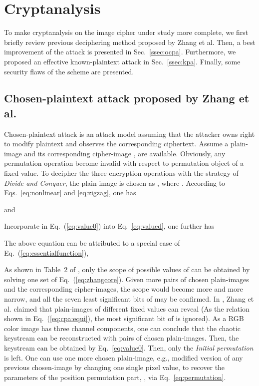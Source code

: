 \documentclass{ws-ijbc}
\begin{document}
\section{Cryptanalysis}
\label{sec:ca}

To make cryptanalysis on the image cipher under study more complete, we first briefly
review previous deciphering method proposed by Zhang et al. Then, a best improvement of the attack
is presented in Sec.~\ref{ssec:ocpa}. Furthermore, we proposed an effective known-plaintext attack in Sec.~\ref{ssec:kpa}.
Finally, some security flaws of the scheme are presented.

\subsection{Chosen-plaintext attack proposed by Zhang et al.}
\label{subsec:cpa:zhang}

Chosen-plaintext attack is an attack model assuming that the attacker owns right to modify
plaintext and observes the corresponding ciphertext. Assume a plain-image  and its corresponding cipher-image ,  are available.
Obviously, any permutation operation become invalid with respect to permutation object of a fixed value. To decipher the three encryption operations with the strategy of
\textit{Divide and Conquer}, the plain-image is chosen as  , where . According to Eqs.~\eqref{eq:nonlinear} and \eqref{eq:zigzag}, one has

and

Incorporate  in Eq.~(\ref{eq:value0}) into Eq.~\eqref{eq:valued}, one further has
\begin{linenomath}

\end{linenomath}
The above equation can be attributed to a special case of Eq.~(\ref{eq:essentialfunction}),
\begin{linenomath}

\end{linenomath}
As shown in Table~2 of \cite{Cqli:breakmodulo:IJBC13}, only the scope of possible values of 
can be obtained by solving one set of Eq.~(\ref{eq:zhangcore}). Given more pairs of chosen plain-images
and the corresponding cipher-images, the scope would become more and more narrow, and all the seven least significant
bits of  may be confirmed. In \cite{Zhang:Cryptanalyzing:MTA2014}, Zhang et al. claimed that  plain-images of different fixed values can reveal
 (As the relation shown in Eq.~(\ref{eq:cpa:equi}), the most significant bit of  is ignored). As a RGB color image has three channel components,
one can conclude that the chaotic keystream  can
be reconstructed with  pairs of chosen
plain-images. Then, the keystream
 can be obtained by Eq.~\eqref{eq:value0}.
Then, only the \textit{Initial permutation} is left. One can use one more chosen plain-image, e.g., modified version of any previous chosen-image by
changing one single pixel value, to recover the parameters of the position permutation part, ,
via Eq.~\eqref{eq:permutation}.
\end{document}
